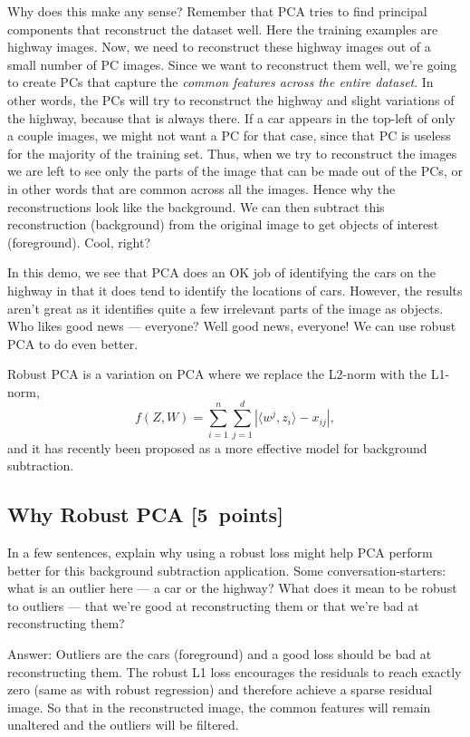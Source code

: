 \documentclass{article}
\newcommand{\blu}[1]{{\textcolor{blu}{#1}}}
\newenvironment{answer}{\par\begingroup\color{gre}Answer: }{\endgroup}
\let\ask\blu
\newcommand\pts[1]{\textcolor{pointscolour}{[#1~points]}}
\begin{document}
Why does this make any sense? Remember that PCA tries to find principal components that reconstruct the dataset well. Here the training examples are highway images. Now, we need to reconstruct these highway images out of a small number of PC images. Since we want to reconstruct them well, we're going to create PCs that capture the \emph{common features across the entire dataset}. In other words, the PCs will try to reconstruct the highway and slight variations of the highway, because that is always there. If a car appears in the top-left of only a couple images, we might not want a PC for that case, since that PC is useless for the majority of the training set. Thus, when we try to reconstruct the images we are left to see only the parts of the image that can be made out of the PCs, or in other words that are common across all the images. Hence why the reconstructions look like the background. We can then subtract this reconstruction (background) from the original image to get objects of interest (foreground). Cool, right?

In this demo, we see that PCA does an OK job of identifying the cars on the highway in that it does tend to identify the locations of cars. However, the results aren't great as it identifies quite a few irrelevant parts of the image as objects. Who likes good news --- everyone? Well good news, everyone! We can use robust PCA to do even better.

Robust PCA is a variation on PCA where we replace the L2-norm with the L1-norm,
\[
f(Z,W) = \sum_{i=1}^n\sum_{j=1}^d |\langle w^j, z_i\rangle - x_{ij}|,
\]
and it has recently been proposed as a more effective model for background subtraction.

\subsection{Why Robust PCA \pts{5}}

\ask{In a few sentences, explain why using a robust loss might help PCA perform better for this background subtraction application.} Some conversation-starters: what is an outlier here --- a car or the highway? What does it mean to be robust to outliers --- that we're good at reconstructing them or that we're bad at reconstructing them?
\begin{answer}
    Outliers are the cars (foreground) and a good loss should be bad at reconstructing them. The robust L1 loss encourages the residuals to reach exactly zero (same as with robust regression) and therefore achieve a sparse residual image. So that in the reconstructed image, the common features will remain unaltered and the outliers will be filtered.
\end{answer}
\end{document}
